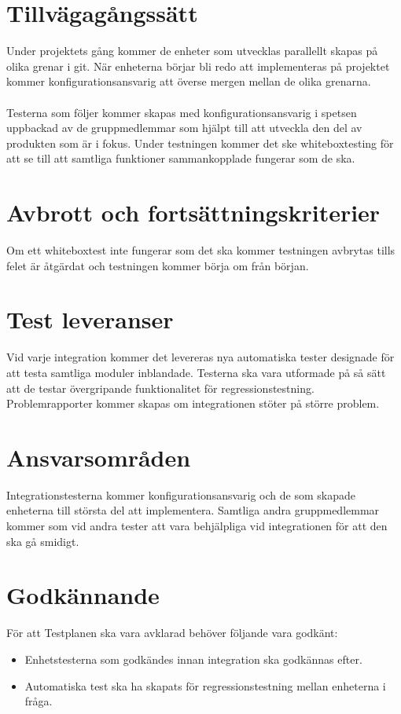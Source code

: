 \section{Tillvägagångssätt}
	Under projektets gång kommer de enheter som utvecklas parallellt skapas på olika grenar i git. När enheterna börjar bli redo att implementeras på projektet kommer konfigurationsansvarig att överse mergen mellan de olika grenarna.\\
	\\
	Testerna som följer kommer skapas med konfigurationsansvarig i spetsen uppbackad av de gruppmedlemmar som hjälpt till att utveckla den del av produkten som är i fokus. Under testningen kommer det ske whiteboxtesting för att se till att samtliga funktioner sammankopplade fungerar som de ska. 



\section{Avbrott och fortsättningskriterier}
	Om ett whiteboxtest inte fungerar som det ska kommer testningen avbrytas tills felet är åtgärdat och testningen kommer börja om från början. 
	


\section{Test leveranser}
	Vid varje integration kommer det levereras nya automatiska tester designade för att testa samtliga moduler inblandade. Testerna ska vara utformade på så sätt att de testar övergripande funktionalitet för regressionstestning. Problemrapporter kommer skapas om integrationen stöter på större problem.

	

	

\section{Ansvarsområden}
	Integrationstesterna kommer konfigurationsansvarig och de som skapade enheterna till största del att implementera. Samtliga andra gruppmedlemmar kommer som vid andra tester att vara behjälpliga vid integrationen för att den ska gå smidigt. 


	
	
	
\section{Godkännande}
	För att Testplanen ska vara avklarad behöver följande vara godkänt:
	\begin{itemize}
	 \item Enhetstesterna som godkändes innan integration ska godkännas efter.
	\item Automatiska test ska ha skapats för regressionstestning mellan enheterna i fråga. 
	\end{itemize}
	



\printbibliography


